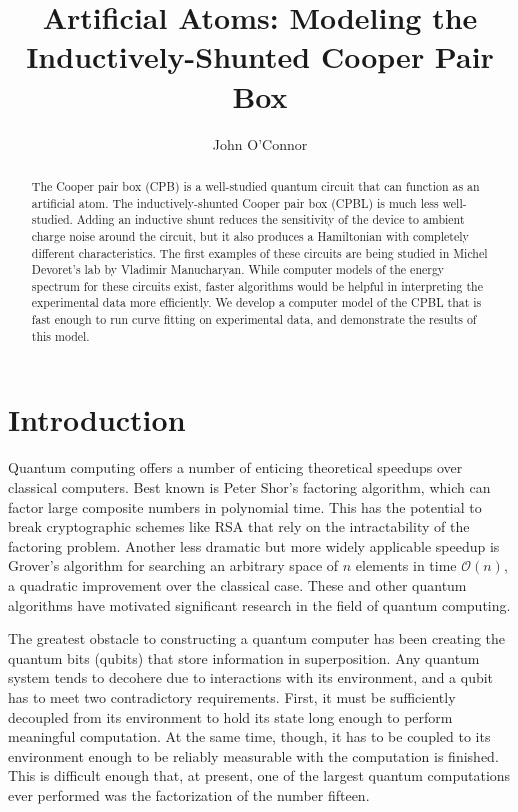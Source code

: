 \documentclass[twocolumn]{revtex4}
\begin{document}
\title{Artificial Atoms: Modeling the Inductively-Shunted Cooper Pair
  Box}
\author{John O'Connor}

\begin{abstract}
  The Cooper pair box (CPB) is a well-studied quantum circuit that can
  function as an artificial atom. The inductively-shunted Cooper pair
  box (CPBL) is much less well-studied. Adding an inductive shunt
  reduces the sensitivity of the device to ambient charge noise around
  the circuit, but it also produces a Hamiltonian with completely
  different characteristics. The first examples of these circuits are
  being studied in Michel Devoret's lab by Vladimir Manucharyan.
  While computer models of the energy spectrum for these circuits
  exist, faster algorithms would be helpful in interpreting the
  experimental data more efficiently. We develop a computer model of
  the CPBL that is fast enough to run curve fitting on experimental
  data, and demonstrate the results of this model.
\end{abstract}

\maketitle

\section{Introduction}

Quantum computing offers a number of enticing theoretical speedups
over classical computers. Best known is Peter Shor's factoring
algorithm, which can factor large composite numbers in polynomial
time. This has the potential to break cryptographic schemes like RSA
that rely on the intractability of the factoring problem. Another less
dramatic but more widely applicable speedup is Grover's algorithm for
searching an arbitrary space of $n$ elements in time $\mathcal{O}(n)$,
a quadratic improvement over the classical case. These and other
quantum algorithms have motivated significant research in the field of
quantum computing.

The greatest obstacle to constructing a quantum computer has been
creating the quantum bits (qubits) that store information in
superposition. Any quantum system tends to decohere due to
interactions with its environment, and a qubit has to meet two
contradictory requirements. First, it must be sufficiently decoupled
from its environment to hold its state long enough to perform
meaningful computation. At the same time, though, it has to be coupled
to its environment enough to be reliably measurable with the
computation is finished. This is difficult enough that, at present,
one of the largest quantum computations ever performed was the
factorization of the number fifteen.\cite{Vandersypen}
\end{document}
